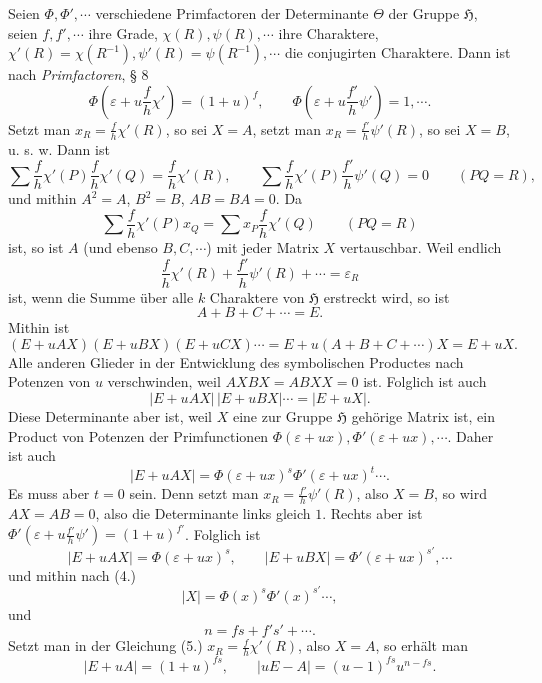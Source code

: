 \documentclass[11pt]{article}
\newcommand{\Hgr}{\mathfrak{H}}
\newcommand{\eps}{\varepsilon}
\begin{document}
Seien $\Phi,\Phi',\cdots$ verschiedene Primfactoren der Determinante $\Theta$ der Gruppe $\Hgr$, seien $f,f',\cdots$ ihre Grade, $\chi(R),\psi(R),\cdots$ ihre Charaktere, $\chi'(R)=\chi(R^{-1}),\psi'(R)=\psi(R^{-1}),\cdots$ die conjugirten Charaktere. Dann ist nach \emph{Primfactoren}, § 8
\begin{equation}\tag{2.}
\Phi\!\left(\eps+u\frac{f}{h}\chi'\right)=(1+u)^f,
\qquad
\Phi\!\left(\eps+u\frac{f'}{h}\psi'\right)=1,\cdots .
\end{equation}
Setzt man $x_R=\frac{f}{h}\chi'(R)$, so sei $X=A$, setzt man $x_R=\frac{f'}{h}\psi'(R)$, so sei $X=B$, u. s. w. Dann ist
\[
\sum \frac{f}{h}\chi'(P)\frac{f}{h}\chi'(Q)=\frac{f}{h}\chi'(R),
\qquad
\sum \frac{f}{h}\chi'(P)\frac{f'}{h}\psi'(Q)=0\qquad(PQ=R),
\]
und mithin $A^2=A$, $B^2=B$, $AB=BA=0$. Da
\[
\sum \frac{f}{h}\chi'(P)x_Q=\sum x_P\frac{f}{h}\chi'(Q)\qquad(PQ=R)
\]
ist, so ist $A$ (und ebenso $B,C,\cdots$) mit jeder Matrix $X$ vertauschbar. Weil endlich
\[
\frac{f}{h}\chi'(R)+\frac{f'}{h}\psi'(R)+\cdots=\eps_R
\]
ist, wenn die Summe über alle $k$ Charaktere von $\Hgr$ erstreckt wird, so ist
\begin{equation}\tag{3.}
A+B+C+\cdots=E.
\end{equation}
Mithin ist
\[
(E+uAX)(E+uBX)(E+uCX)\cdots=E+u(A+B+C+\cdots)X=E+uX.
\]
Alle anderen Glieder in der Entwicklung des symbolischen Productes nach Potenzen von $u$ verschwinden, weil $AXBX=ABXX=0$ ist. Folglich ist auch
\begin{equation}\tag{4.}
|E+uAX|\,|E+uBX|\cdots=|E+uX|.
\end{equation}
Diese Determinante aber ist, weil $X$ eine zur Gruppe $\Hgr$ gehörige Matrix ist, ein Product von Potenzen der Primfunctionen $\Phi(\eps+ux),\Phi'(\eps+ux),\cdots$. Daher ist auch
\[
|E+uAX|=\Phi(\eps+ux)^s\Phi'(\eps+ux)^t\cdots.
\]
Es muss aber $t=0$ sein. Denn setzt man $x_R=\frac{f'}{h}\psi'(R)$, also $X=B$, so wird $AX=AB=0$, also die Determinante links gleich $1$. Rechts aber ist $\Phi'(\eps+u\frac{f'}{h}\psi')=(1+u)^{f'}$. Folglich ist
\begin{equation}\tag{5.}
|E+uAX|=\Phi(\eps+ux)^s,
\qquad
|E+uBX|=\Phi'(\eps+ux)^{s'},\cdots
\end{equation}
und mithin nach (4.)
\begin{equation}\tag{6.}
|X|=\Phi(x)^s\Phi'(x)^{s'}\cdots,
\end{equation}
und
\[
n=fs+f's'+\cdots.
\]
Setzt man in der Gleichung (5.) $x_R=\frac{f}{h}\chi'(R)$, also $X=A$, so erhält man
\begin{equation}\tag{7.}
|E+uA|=(1+u)^{fs},
\qquad |uE-A|=(u-1)^{fs}u^{n-fs}.
\end{equation}
\end{document}
